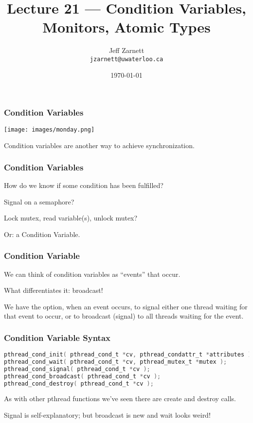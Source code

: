 

\title{Lecture 21 --- Condition Variables, Monitors, Atomic Types }

\author{Jeff Zarnett \\ \small \texttt{jzarnett@uwaterloo.ca}}
\date{\today}




\begin{frame}
	\titlepage

\end{frame}


\begin{frame}
	\frametitle{Condition Variables}

	\begin{center}
		\texttt{[image: images/monday.png]}
	\end{center}

	Condition variables are another way to achieve synchronization.

\end{frame}

\begin{frame}
	\frametitle{Condition Variables}

	How do we know if some condition has been fulfilled?

	Signal on a semaphore?

	Lock mutex, read variable(s), unlock mutex?

	Or: a Condition Variable.

\end{frame}


\begin{frame}
	\frametitle{Condition Variable}

	We can think of condition variables as ``events'' that occur.

	What differentiates it: broadcast!

	We have the option, when an event occurs, to signal either one thread waiting for that event to occur, or to broadcast (signal) to all threads waiting for the event.

\end{frame}

\begin{frame}[fragile]
	\frametitle{Condition Variable Syntax}

	\begin{lstlisting}[language=C]
pthread_cond_init( pthread_cond_t *cv, pthread_condattr_t *attributes );
pthread_cond_wait( pthread_cond_t *cv, pthread_mutex_t *mutex );
pthread_cond_signal( pthread_cond_t *cv );
pthread_cond_broadcast( pthread_cond_t *cv );
pthread_cond_destroy( pthread_cond_t *cv );
\end{lstlisting}

	As with other pthread functions we've seen there are create and destroy calls.

	Signal is self-explanatory; but broadcast is new and wait looks weird!

\end{frame}


